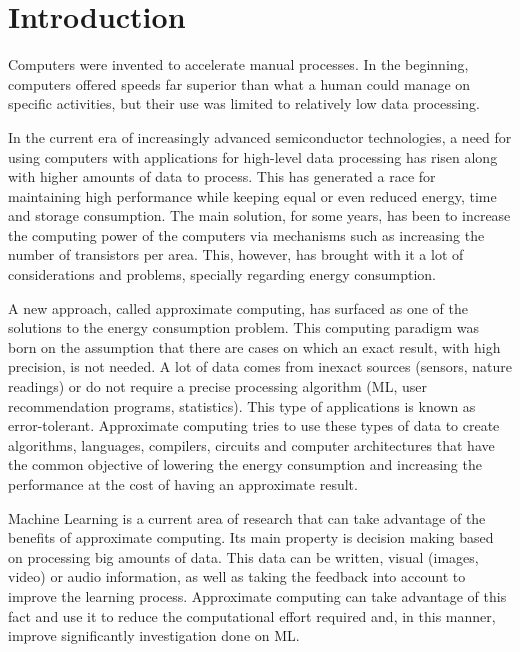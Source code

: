 
\chapter{Introduction}
\label{chp:intro}

Computers were invented to accelerate manual processes. In the beginning, computers
offered speeds far superior than what a human could manage on specific activities, but their use
was limited to relatively low data processing. 

In the current era of increasingly advanced semiconductor technologies, a need for using computers 
with applications for high-level data processing has risen along with higher amounts of data to process.
This has generated a race for maintaining high performance while keeping equal or even reduced 
energy, time and storage consumption. The main solution, for some years, has been to increase the 
computing power of the computers via mechanisms such as increasing the number of transistors
per area. This, however, has brought with it a lot of considerations and problems, specially 
regarding energy consumption.

A new approach, called approximate computing, has surfaced as one of the solutions to the energy consumption problem.
This computing paradigm was born on the assumption that there are cases on which an exact result, with high precision,
is not needed. A lot of data comes from inexact sources (sensors, nature readings) or do not require a precise processing
algorithm (ML, user recommendation programs, statistics). This type of applications is
known as error-tolerant. Approximate computing tries to use these types of data to create algorithms,
languages, compilers, circuits and computer architectures that have the common objective of lowering
the energy consumption and increasing the performance at the cost of having an approximate result.

Machine Learning is a current area of research that can take advantage of the benefits of approximate
computing. Its main property is
decision making based on processing big amounts of data. This data can be written, visual (images, video) or 
audio information, as well as taking the feedback into account to improve the learning process.
Approximate computing can take advantage of this fact and use it to reduce the computational effort
required and, in this manner, improve significantly investigation done on ML.

